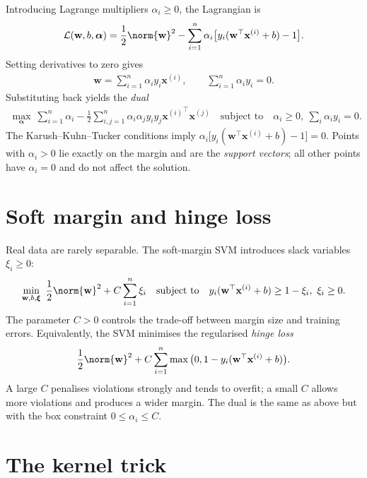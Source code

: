 \documentclass[a4paper, 12pt]{book}
\begin{document}
Introducing Lagrange multipliers $\alpha_i \geq 0$, the Lagrangian is
\begin{align}
    \mathcal{L}(\mathbf{w},b,\boldsymbol{\alpha})
    = \frac{1}{2}\norm{\mathbf{w}}^2
    - \sum_{i=1}^n \alpha_i\big[y_i(\mathbf{w}^\top\mathbf{x}^{(i)}+b)-1\big].
\end{align}
Setting derivatives to zero gives
\begin{align}
    \mathbf{w} = \sum_{i=1}^n \alpha_i y_i \mathbf{x}^{(i)},
    \qquad
    \sum_{i=1}^n \alpha_i y_i = 0.
\end{align}
Substituting back yields the \emph{dual}
\begin{align}
    \max_{\boldsymbol{\alpha}}\
    \sum_{i=1}^n \alpha_i
    - \frac{1}{2}\sum_{i,j=1}^n \alpha_i\alpha_j y_i y_j
      {\mathbf{x}^{(i)}}^\top\mathbf{x}^{(j)}
    \quad \text{subject to} \quad
    \alpha_i \geq 0,\ \sum_i \alpha_i y_i = 0.
\end{align}
The Karush--Kuhn--Tucker conditions imply
$\alpha_i\big[y_i(\mathbf{w}^\top\mathbf{x}^{(i)}+b)-1\big]=0$. Points with
$\alpha_i>0$ lie exactly on the margin and are the \emph{support vectors}; all other
points have $\alpha_i=0$ and do not affect the solution.

\section{Soft margin and hinge loss}

Real data are rarely separable. The soft-margin SVM introduces slack variables
$\xi_i \geq 0$:
\begin{align}
    \min_{\mathbf{w},b,\boldsymbol{\xi}}\
    \frac{1}{2}\norm{\mathbf{w}}^2 + C\sum_{i=1}^n \xi_i
    \quad \text{subject to} \quad
    y_i(\mathbf{w}^\top\mathbf{x}^{(i)}+b) \geq 1-\xi_i,\ \xi_i \geq 0.
\end{align}
The parameter $C>0$ controls the trade-off between margin size and training errors.
Equivalently, the SVM minimises the regularised \emph{hinge loss}
\begin{align}
    \frac{1}{2}\norm{\mathbf{w}}^2
    + C\sum_{i=1}^n \max\big(0, 1-y_i(\mathbf{w}^\top\mathbf{x}^{(i)}+b)\big).
\end{align}
A large $C$ penalises violations strongly and tends to overfit; a small $C$ allows
more violations and produces a wider margin. The dual is the same as above but with
the box constraint $0 \leq \alpha_i \leq C$.

\section{The kernel trick}
\end{document}

